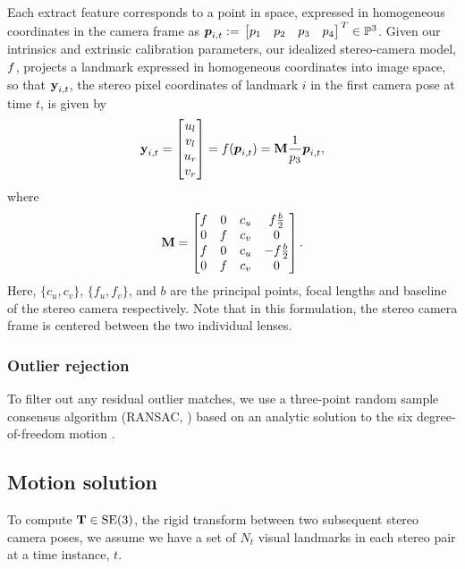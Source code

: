 Each extract feature corresponds to a
point in space, expressed in homogeneous coordinates in the camera frame as
$\HomogeneousPoint{i}{t} := \Transpose{\bbm p_1 & p_2 & p_3 & p_4 \ebm} \in
\HomogeneousNumbers[3]$.  Given our intrinsics and extrinsic calibration parameters, our idealized stereo-camera model, $f$,
projects a landmark expressed in homogeneous coordinates into image space, so
that $\boldsymbol{\mathbf{y}}_{i,t}$, the stereo pixel coordinates of landmark $i$ in the first camera pose at time $t$, is given
by 
\begin{equation}
	\boldsymbol{\mathbf{y}}_{i,t} = \begin{bmatrix} u_l \\ v_l \\ u_r \\ v_r \end{bmatrix} 
  = f(\boldsymbol{p}_{i,t}) 
  = \boldsymbol{\mathbf{M}} \frac{1}{p_3}\boldsymbol{p}_{i,t},
\end{equation}
where
\begin{equation}
 \boldsymbol{\mathbf{M}} = \begin{bmatrix} f & 0 & c_u & f \frac{b}{2} \\ 0 & f & c_v & 0 \\ f 
                        & 0 & c_u & -f\frac{b}{2} \\ 0 & f & c_v & 0 \end{bmatrix}.
\end{equation}
Here, $\{c_u, c_v\}$, $\{f_u, f_v\}$, and $b$ are the principal points, focal
lengths and baseline of the stereo camera respectively. Note that in this
formulation, the stereo camera frame is centered between the two individual
lenses.  


\subsubsection{Outlier rejection}

To filter out any residual outlier matches, we use a three-point random sample consensus algorithm (RANSAC, \cite{FischlerRANSAC:1981}) based on an analytic solution to the six degree-of-freedom motion \citep{Umeyama1991-ws}.
  
\subsection{Motion solution}

To compute
$\boldsymbol{\mathbf{T}}\in\text{SE}(3)$, the rigid transform between two subsequent stereo camera poses, we assume we have a set
of $N_t$ visual landmarks in each stereo pair at a time instance, $t$.

